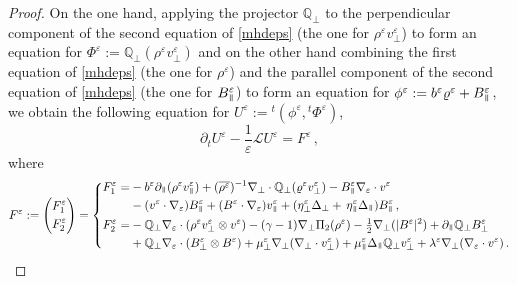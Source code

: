 \documentclass[11pt,reqno]{amsart}
\def \Q{{\mathbb{Q}}}
\newcommand{\myparallel}{{\mkern3mu\vphantom{\perp}\vrule depth 0pt\mkern2mu\vrule depth 0pt\mkern3mu}}
\begin{document}
\begin{proof}
  On the one hand, applying the projector $\Q_\perp$ to the perpendicular component of the second equation of \eqref{mhdeps} (the one for $\rho^\varepsilon v_\perp^\varepsilon$) to form an equation for $\Phi^\varepsilon:=\Q_\perp(\rho^\varepsilon v_\perp^\varepsilon)$ and on the other hand combining the first equation of \eqref{mhdeps} (the one for $\rho^\varepsilon$) and the parallel component of the second equation of \eqref{mhdeps} (the one for $B_\myparallel^\varepsilon$) to form an equation for $\phi^\varepsilon := b^\varepsilon \varrho^\varepsilon + B_\myparallel^\varepsilon$, we obtain the following equation for $U^\varepsilon:={}^t(\phi^\varepsilon, {}^t\Phi^\varepsilon)$,
  \begin{equation}
    \label{eqn:Ueps}
      \partial_t U^\varepsilon - \frac{1}{\varepsilon} \mathcal L  U^\varepsilon = F^\varepsilon\,,
  \end{equation}
  where
  \begin{equation}
    \label{eqn:Feps}
    F^\varepsilon:=
    \left (\begin{aligned}
     F_1^\varepsilon\\ F_2^\varepsilon
  \end{aligned}
    \right) =
    \left\{
  \begin{aligned}
    F_1^\varepsilon =& -b^\varepsilon\partial_\myparallel (\rho^\varepsilon v_\myparallel^\varepsilon) + (\overline{\rho^\varepsilon})^{-1}
    \nabla_\perp \cdot \Q_\perp(\varrho^\varepsilon v_\perp^\varepsilon) -B_\myparallel^\varepsilon  \nabla_\varepsilon \cdot v^\varepsilon \\
      & - (v^\varepsilon\cdot\nabla_\varepsilon)B_\myparallel^\varepsilon 
    +(B^\varepsilon\cdot\nabla_\varepsilon)v_\myparallel^\varepsilon + (\eta_\perp^\varepsilon\Delta_\perp+\, \eta_\myparallel^\varepsilon\Delta_\myparallel)B_\myparallel^\varepsilon\,,\\
     F_2^\varepsilon =& -\Q_\perp\nabla_\varepsilon \cdot (\rho^\varepsilon v_\perp^\varepsilon \otimes v^\varepsilon)
    -(\gamma-1)\nabla_\perp\Pi_2(\rho^\varepsilon) -\tfrac12 \nabla_\perp(|B^\varepsilon|^2) + \partial_\myparallel \Q_\perp B_\perp^\varepsilon \\
    & + \Q_\perp\nabla_\varepsilon \cdot (B_\perp^\varepsilon \otimes B^\varepsilon) + \mu_\perp^\varepsilon \nabla_\perp(\nabla_\perp \cdot v_\perp^\varepsilon)
    + \mu_\myparallel^\varepsilon \Delta_\myparallel \Q_\perp v_\perp^\varepsilon  +\lambda^\varepsilon\nabla_\perp(\nabla_\varepsilon \cdot v^\varepsilon)\,.
  \end{aligned}
  \right.
  \end{equation}


\end{proof}
\end{document}
